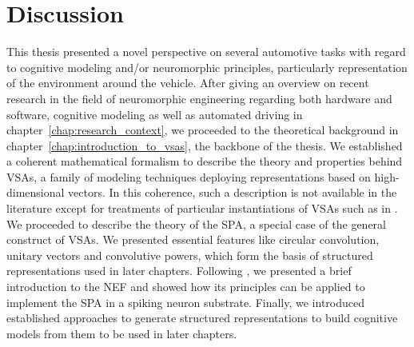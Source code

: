 \chapter{Discussion}%
\label{chap:discussion}

This thesis presented a novel perspective on several automotive tasks with regard to cognitive modeling and/or neuromorphic principles, particularly representation of the environment around the vehicle.
After giving an overview on recent research in the field of neuromorphic engineering regarding both hardware and software, cognitive modeling as well as automated driving in chapter~\ref{chap:research_context}, we proceeded to the theoretical background in chapter~\ref{chap:introduction_to_vsas}, the backbone of the thesis.
We established a coherent mathematical formalism to describe the theory and properties behind \acp{VSA}, a family of modeling techniques deploying representations based on high-dimensional vectors.
In this coherence, such a description is not available in the literature except for treatments of particular instantiations of \acp{VSA} such as in \textcites{Plate1994}{Gayler1998}{Kanerva2009}.
We proceeded to describe the theory of the \ac{SPA}, a special case of the general construct of \acp{VSA}.
We presented essential features like circular convolution, unitary vectors and convolutive powers, which form the basis of structured representations used in later chapters.
Following \textcite{Eliasmith2003}, we presented a brief introduction to the \ac{NEF} and showed how its principles can be applied to implement the \ac{SPA} in a spiking neuron substrate.
Finally, we introduced established approaches to generate structured representations to build cognitive models from them to be used in later chapters.

